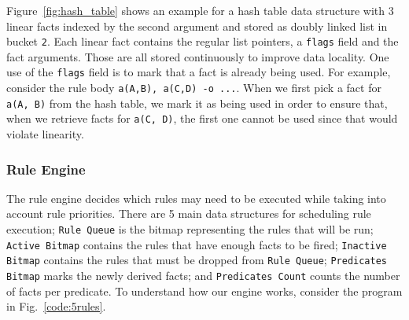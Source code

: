 Figure~\ref{fig:hash_table} shows an example for a hash table data structure
with 3 linear facts indexed by the second argument and stored as doubly linked list
in bucket \texttt{2}. Each linear fact contains the regular list pointers, a \texttt{flags} field
and the fact arguments. Those are all stored continuously to improve data
locality. One use of the \texttt{flags} field is to mark that a fact is already being used. For example,
consider the rule body \texttt{a(A,B), a(C,D) -o ...}. When we first pick a fact for \texttt{a(A, B)} from the hash table,
we mark it as being used in order to ensure that, when we retrieve facts for \texttt{a(C, D)}, the first one
cannot be used since that would violate linearity.

\subsubsection{Rule Engine}\label{rule_engine}

The rule engine decides which rules may need to be executed while taking into account rule priorities.
There are 5 main data structures for scheduling rule execution;
\texttt{Rule Queue} is the bitmap representing the rules that will be run;
\texttt{Active Bitmap} contains the rules that have enough facts to be fired;
\texttt{Inactive Bitmap} contains the rules that must be dropped from \texttt{Rule Queue};
\texttt{Predicates Bitmap} marks the newly derived facts;
and \texttt{Predicates Count} counts the number of facts per predicate.
To understand how our engine works, consider the program in Fig.~\ref{code:5rules}.

